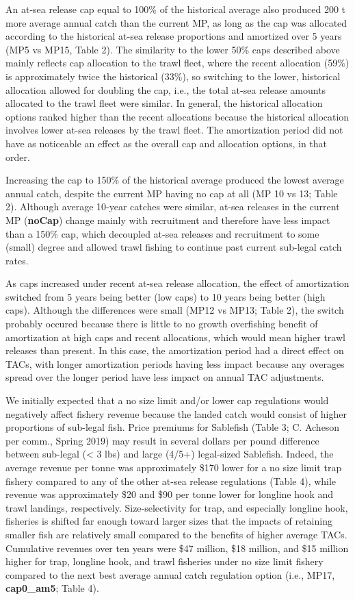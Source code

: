 \documentclass[11pt]{book}
\begin{document}
An at-sea release cap equal to 100\% of the historical average also produced 200 t more average annual catch than the current MP, as long as the cap was allocated according to the historical at-sea release proportions and amortized over 5 years (MP5 vs MP15, Table 2). The similarity to the lower 50\% caps described above mainly reflects cap allocation to the trawl fleet, where the recent allocation (59\%) is approximately twice the historical (33\%), so switching to the lower, historical allocation allowed for doubling the cap, i.e., the total at-sea release amounts allocated to the trawl fleet were similar. In general, the historical allocation options ranked higher than the recent allocations because the historical allocation involves lower at-sea releases by the trawl fleet. The amortization period did not have as noticeable an effect as the overall cap and allocation options, in that order.

Increasing the cap to 150\% of the historical average produced the lowest average annual catch, despite the current MP having no cap at all (MP 10 vs 13; Table 2). Although average 10-year catches were similar, at-sea releases in the current MP (\textbf{noCap}) change mainly with recruitment and therefore have less impact than a 150\% cap, which decoupled at-sea releases and recruitment to some (small) degree and allowed trawl fishing to continue past current sub-legal catch rates.

As caps increased under recent at-sea release allocation, the effect of amortization switched from 5 years being better (low caps) to 10 years being better (high caps). Although the differences were small (MP12 vs MP13; Table 2), the switch probably occured because there is little to no growth overfishing benefit of amortization at high caps and recent allocations, which would mean higher trawl releases than present. In this case, the amortization period had a direct effect on TACs, with longer amortization periods having less impact because any overages spread over the longer period have less impact on annual TAC adjustments.

We initially expected that a no size limit and/or lower cap regulations would negatively affect fishery revenue because the landed catch would consist of higher proportions of sub-legal fish. Price premiums for Sablefish (Table 3; C. Acheson per comm., Spring 2019) may result in several dollars per pound difference between sub-legal (\textless{} 3 lbs) and large (4/5+) legal-sized Sablefish. Indeed, the average revenue per tonne was approximately \$170 lower for a no size limit trap fishery compared to any of the other at-sea release regulations (Table 4), while revenue was approximately \$20 and \$90 per tonne lower for longline hook and trawl landings, respectively. Size-selectivity for trap, and especially longline hook, fisheries is shifted far enough toward larger sizes that the impacts of retaining smaller fish are relatively small compared to the benefits of higher average TACs. Cumulative revenues over ten years were \$47 million, \$18 million, and \$15 million higher for trap, longline hook, and trawl fisheries under no size limit fishery compared to the next best average annual catch regulation option (i.e., MP17, \textbf{cap0\_am5}; Table 4).
\end{document}
